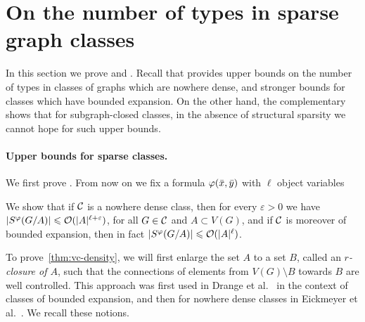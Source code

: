 \section{On the number of types in sparse graph classes}\label{sec:types}

In this section we prove  and .
	Recall that  provides upper bounds on the number of types in classes of graphs which are nowhere dense, 
	and stronger bounds for classes which have bounded expansion. 
	On the other hand, the complementary  shows that for subgraph-closed classes, in the absence of structural sparsity we cannot hope for such upper bounds.

\paragraph*{Upper bounds for sparse classes.}
We first prove .
From now on we fix a formula  $\varphi(\bar{x},\bar{y})$
with $\ell$ object variables

We show  that if $\mathcal{C}$ is a nowhere dense class,
then for every $\varepsilon>0$ we have  $|S^\varphi(G/A)|\leqslant \mathcal{O}(|A|^{\ell+\varepsilon})$,
for all $G\in \mathcal{C}$ and $A\subset V(G)$,
 and 
if $\mathcal{C}$ is moreover of bounded expansion, then in fact $|S^\varphi(G/A)|\leqslant \mathcal{O}(|A|^\ell)$.


To prove~\cref{thm:vc-density},
we will first enlarge the set $A$ to a set $B$, called
an \emph{$r$-closure of $A$}, such 
that the connections of elements from $V(G)\setminus B$ 
towards $B$ are well controlled. This approach
was first used in Drange et al.~\cite{drange2016kernelization} in the context of classes of bounded expansion, 
and then for nowhere dense classes in Eickmeyer et al.~\cite{eickmeyer2016neighborhood}. 
We recall these notions.

